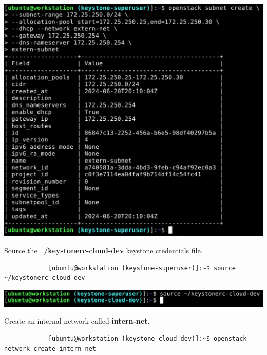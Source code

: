 \documentclass[letterpaper, 12pt]{article}
\begin{document}
\begin{enumerate}
\begin{labstep}
        \begin{center}
            \includegraphics[width=\linewidth]{images/part1/step22.png}
        \end{center}
    \end{labstep}

    \begin{labstep}
        Source the \textbf{~/keystonerc-cloud-dev} keystone credentials file.
        \begin{lstlisting}
            [ubuntu@workstation (keystone-superuser)]:~$ source ~/keystonerc-cloud-dev
        \end{lstlisting}

        \begin{center}
            \includegraphics[width=\linewidth]{images/part1/step23.png}
        \end{center}
    \end{labstep}

    \begin{labstep}
        Create an internal network called \textbf{intern-net}.
        \begin{lstlisting}
            [ubuntu@workstation (keystone-cloud-dev)]:~$ openstack network create intern-net
        \end{lstlisting}


\end{labstep}
\end{enumerate}
\end{document}
